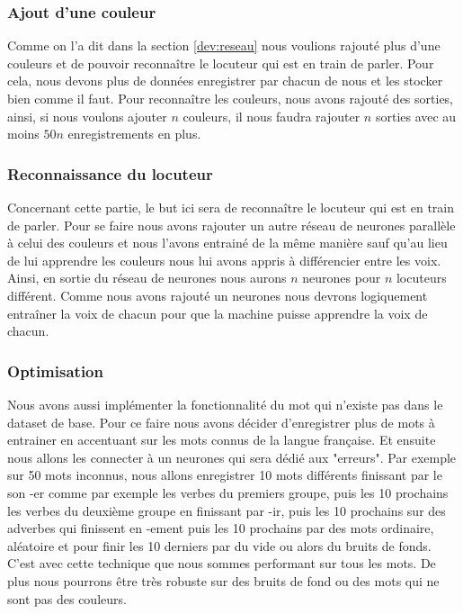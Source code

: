 \documentclass[a4paper,11pt]{article}
\begin{document}
\subsubsection{Ajout d'une couleur}
Comme on l'a dit dans la section \ref{dev:reseau} nous voulions rajouté plus d'une couleurs et de pouvoir reconnaître le locuteur qui est en train de parler. Pour cela, nous devons plus de données enregistrer par chacun de nous et les stocker bien comme il faut. Pour reconnaître les couleurs, nous avons rajouté des sorties, ainsi, si nous voulons ajouter $n$ couleurs, il nous faudra rajouter $n$ sorties avec au moins $50n$ enregistrements en plus. 

\subsubsection{Reconnaissance du locuteur}\label{locuteur}
Concernant cette partie, le but ici sera de reconnaître le locuteur qui est en train de parler. Pour se faire nous avons rajouter un autre réseau de neurones parallèle à celui des couleurs et nous l'avons entrainé de la même manière sauf qu'au lieu de lui apprendre les couleurs nous lui avons appris à différencier entre les voix. Ainsi, en sortie du réseau de neurones nous aurons $n$ neurones pour $n$ locuteurs différent. Comme nous avons rajouté un neurones nous devrons logiquement entraîner la voix de chacun pour que la machine puisse apprendre la voix de chacun. 

\subsubsection{Optimisation} \label{erreur}
Nous avons aussi implémenter la fonctionnalité du mot qui n'existe pas dans le dataset de base. Pour ce faire nous avons décider d'enregistrer plus de mots à entrainer en accentuant sur les mots connus de la langue française. Et ensuite nous allons les connecter à un neurones qui sera dédié aux "erreurs". Par exemple sur 50 mots inconnus, nous allons enregistrer 10 mots différents finissant par le son -er comme par exemple les verbes du premiers groupe, puis les 10 prochains les verbes du deuxième groupe en finissant par -ir, puis les 10 prochains sur des adverbes qui finissent en -ement puis les 10 prochains par des mots ordinaire, aléatoire et pour finir les 10 derniers par du vide ou alors du bruits de fonds. C'est avec cette technique que nous sommes performant sur tous les mots. De plus nous pourrons être très robuste sur des bruits de fond ou des mots qui ne sont pas des couleurs.
\end{document}
